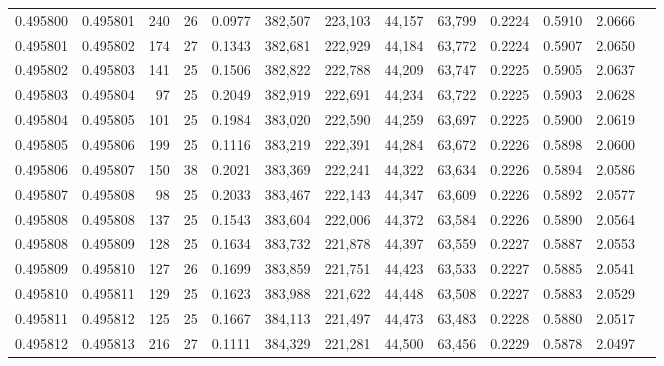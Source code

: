 \begin{tabular}{rrrrrrrrrrrrr}
0.495800 & 0.495801 & 240 &  26 &                                     0.0977 & 382,507 & 223,103 &  44,157 &  63,799 & 0.2224 & 0.5910 & 2.0666 \\
0.495801 & 0.495802 & 174 &  27 &                                     0.1343 & 382,681 & 222,929 &  44,184 &  63,772 & 0.2224 & 0.5907 & 2.0650 \\
0.495802 & 0.495803 & 141 &  25 &                                     0.1506 & 382,822 & 222,788 &  44,209 &  63,747 & 0.2225 & 0.5905 & 2.0637 \\
0.495803 & 0.495804 &  97 &  25 &                                     0.2049 & 382,919 & 222,691 &  44,234 &  63,722 & 0.2225 & 0.5903 & 2.0628 \\
0.495804 & 0.495805 & 101 &  25 &                                     0.1984 & 383,020 & 222,590 &  44,259 &  63,697 & 0.2225 & 0.5900 & 2.0619 \\
0.495805 & 0.495806 & 199 &  25 &                                     0.1116 & 383,219 & 222,391 &  44,284 &  63,672 & 0.2226 & 0.5898 & 2.0600 \\
0.495806 & 0.495807 & 150 &  38 &                                     0.2021 & 383,369 & 222,241 &  44,322 &  63,634 & 0.2226 & 0.5894 & 2.0586 \\
0.495807 & 0.495808 &  98 &  25 &                                     0.2033 & 383,467 & 222,143 &  44,347 &  63,609 & 0.2226 & 0.5892 & 2.0577 \\
0.495808 & 0.495808 & 137 &  25 &                                     0.1543 & 383,604 & 222,006 &  44,372 &  63,584 & 0.2226 & 0.5890 & 2.0564 \\
0.495808 & 0.495809 & 128 &  25 &                                     0.1634 & 383,732 & 221,878 &  44,397 &  63,559 & 0.2227 & 0.5887 & 2.0553 \\
0.495809 & 0.495810 & 127 &  26 &                                     0.1699 & 383,859 & 221,751 &  44,423 &  63,533 & 0.2227 & 0.5885 & 2.0541 \\
0.495810 & 0.495811 & 129 &  25 &                                     0.1623 & 383,988 & 221,622 &  44,448 &  63,508 & 0.2227 & 0.5883 & 2.0529 \\
0.495811 & 0.495812 & 125 &  25 &                                     0.1667 & 384,113 & 221,497 &  44,473 &  63,483 & 0.2228 & 0.5880 & 2.0517 \\
0.495812 & 0.495813 & 216 &  27 &                                     0.1111 & 384,329 & 221,281 &  44,500 &  63,456 & 0.2229 & 0.5878 & 2.0497 \\

\end{tabular}
